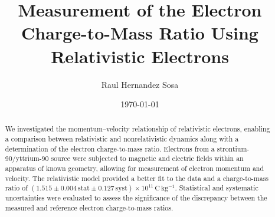 \usepackage{graphicx}      %
\usepackage{bm}            %
\usepackage[colorlinks=true]{hyperref}  %
\usepackage{placeins}



\title{Measurement of the Electron Charge-to-Mass Ratio Using Relativistic Electrons}
\author{Raul Hernandez Sosa}
\date{\today}


\begin{abstract}
    We investigated the momentum–velocity relationship of relativistic electrons, enabling a comparison between relativistic and nonrelativistic dynamics along with a determination of the electron charge-to-mass ratio.
    Electrons from a strontium-90/yttrium-90 source were subjected to magnetic and electric fields within an apparatus of known geometry, allowing for measurement of electron momentum and velocity.
    The relativistic model provided a better fit to the data and a charge-to-mass ratio of $(1.515\pm0.004\,\mathrm{stat}\pm0.127\,\mathrm{syst})\times10^{11}\,\mathrm{C\,kg^{-1}}$.
    Statistical and systematic uncertainties were evaluated to assess the significance of the discrepancy between the measured and reference electron charge-to-mass ratios.
\end{abstract}

\maketitle
\raggedbottom





